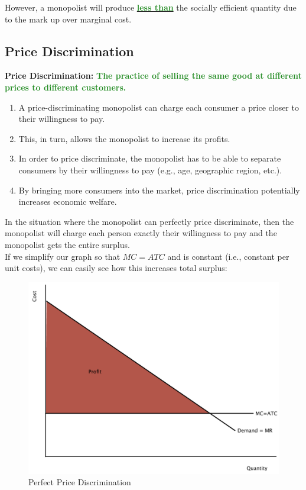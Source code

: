 \documentclass[11pt]{article}\usepackage[]{graphicx}\usepackage[]{color}
\theoremstyle{definition}
\newcommand{\ddp}[1]{{\textbf{\textcolor{ForestGreen}{#1}}}}
\newcommand{\dd}[1]{{\underline{\textbf{\textcolor{ForestGreen}{#1}}}}}
\newcommand{\defn}[1]{\textbf{#1}}
\begin{document}
	However, a monopolist will produce \dd{less than} the socially efficient quantity due to the mark up over marginal cost.

	
	\subsection{Price Discrimination}
	
	\defn{Price Discrimination:} \ddp{The practice of selling the same good at different prices to different customers.\\}
	
	\begin{enumerate}
		\item A price-discriminating monopolist can charge each consumer a price closer to their willingness to pay. 
		\item This, in turn, allows the monopolist to increase its profits.
		\item In order to price discriminate, the monopolist has to be able to separate consumers by their willingness to pay (e.g., age, geographic region, etc.).
		\item By bringing more consumers into the market, price discrimination potentially increases economic welfare.
	\end{enumerate}
	
	
	In the situation where the monopolist can perfectly price discriminate, then the monopolist will charge each person exactly their willingness to pay and the monopolist gets the entire surplus. 
	\\
	
	If we simplify our graph so that $MC = ATC$ and is constant (i.e., constant per unit costs), we can easily see how this increases total surplus:
	
		\begin{figure}[H]
			\centering
			\includegraphics[scale=.40]{plot77.pdf}
			\caption{Perfect Price Discrimination}
		\end{figure}
	
\end{document}
